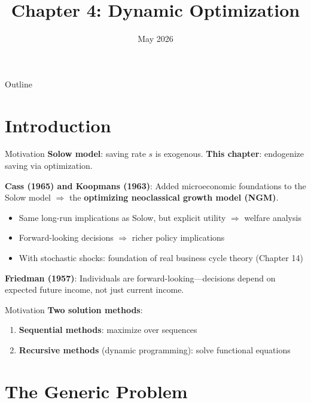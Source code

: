 \documentclass[blue]{beamer}
\title[Chapter4]{Chapter 4: Dynamic Optimization}
\author[]{}
\date[May 2026]{May 2026}
\begin{document}
  \frame
  {
    \titlepage
  }


\begin{frame}{Outline}
	\tableofcontents
\end{frame}


\section{Introduction}

\begin{frame}{Motivation}
	\textbf{Solow model}: saving rate $s$ is exogenous. \textbf{This chapter}: endogenize saving via optimization.
	
	\bigskip
	\textbf{Cass (1965) and Koopmans (1963)}: Added microeconomic foundations to the Solow model $\Rightarrow$ the \textbf{optimizing neoclassical growth model (NGM)}.
	\begin{itemize}
		\item Same long-run implications as Solow, but explicit utility $\Rightarrow$ welfare analysis
		\item Forward-looking decisions $\Rightarrow$ richer policy implications
		\item With stochastic shocks: foundation of real business cycle theory (Chapter 14)
	\end{itemize}
	
	\bigskip
	\textbf{Friedman (1957)}: Individuals are forward-looking---decisions depend on expected future income, not just current income.
\end{frame}
\begin{frame}{Motivation}
	\textbf{Two solution methods}:
	\begin{enumerate}
		\item \textbf{Sequential methods}: maximize over sequences
		\item \textbf{Recursive methods} (dynamic programming): solve functional equations
	\end{enumerate}
\end{frame}

\section{The Generic Problem}
\end{document}
